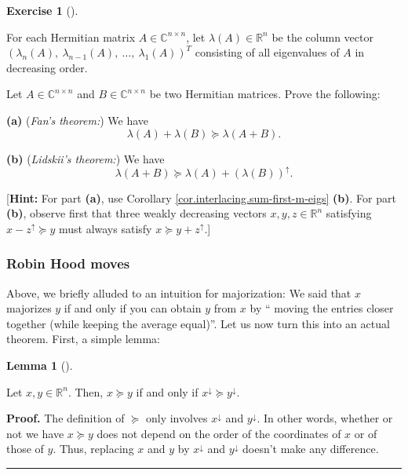 \documentclass[numbers=enddot,12pt,final,onecolumn,notitlepage]{scrartcl}%
\newcounter{exer}
\numberwithin{exer}{subsection}
\theoremstyle{definition}
\newtheorem{lem}[theo]{Lemma}
\newenvironment{lemma}[1][]
{\begin{lem}[#1]\begin{leftbar}}
{\end{leftbar}\end{lem}}
\newtheorem{exmp}[exer]{Exercise}
\newenvironment{exercise}[1][]
{\begin{exmp}[#1]\begin{leftbar}}
{\end{leftbar}\end{exmp}}
\newenvironment{proof}[1][Proof]{\noindent\textbf{#1.} }{\ \rule{0.5em}{0.5em}}
\begin{document}
\begin{exercise}
 For each Hermitian matrix $A\in\mathbb{C}^{n\times n}$, let
$\lambda\left(  A\right)  \in\mathbb{R}^{n}$ be the column vector $\left(
\lambda_{n}\left(  A\right)  ,\ \lambda_{n-1}\left(  A\right)  ,\ \ldots
,\ \lambda_{1}\left(  A\right)  \right)  ^{T}$ consisting of all eigenvalues
of $A$ in decreasing order. \medskip

Let $A\in\mathbb{C}^{n\times n}$ and $B\in\mathbb{C}^{n\times n}$ be two
Hermitian matrices. Prove the following: \medskip

\textbf{(a)} (\emph{Fan's theorem:}) We have%
\[
\lambda\left(  A\right)  +\lambda\left(  B\right)  \succcurlyeq\lambda\left(
A+B\right)  .
\]


\textbf{(b)} (\emph{Lidskii's theorem:}) We have%
\[
\lambda\left(  A+B\right)  \succcurlyeq\lambda\left(  A\right)  +\left(
\lambda\left(  B\right)  \right)  ^{\uparrow}.
\]


[\textbf{Hint:} For part \textbf{(a)}, use Corollary
\ref{cor.interlacing.sum-first-m-eigs} \textbf{(b)}. For part \textbf{(b)},
observe first that three weakly decreasing vectors $x,y,z\in\mathbb{R}^{n}$
satisfying $x-z^{\uparrow}\succcurlyeq y$ must always satisfy $x\succcurlyeq
y+z^{\uparrow}$.]
\end{exercise}

\subsubsection{Robin Hood moves}

Above, we briefly alluded to an intuition for majorization: We said that $x$
majorizes $y$ if and only if you can obtain $y$ from $x$ by \textquotedblleft
moving the entries closer together (while keeping the average
equal)\textquotedblright. Let us now turn this into an actual theorem. First,
a simple lemma:

\begin{lemma}
\label{lem.major.order-ignore}Let $x,y\in\mathbb{R}^{n}$. Then, $x\succcurlyeq
y$ if and only if $x^{\downarrow}\succcurlyeq y^{\downarrow}$.
\end{lemma}

\begin{proof}
The definition of $\succcurlyeq$ only involves $x^{\downarrow}$ and
$y^{\downarrow}$. In other words, whether or not we have $x\succcurlyeq y$
does not depend on the order of the coordinates of $x$ or of those of $y$.
Thus, replacing $x$ and $y$ by $x^{\downarrow}$ and $y^{\downarrow}$ doesn't
make any difference.
\end{proof}
\end{document}
